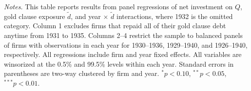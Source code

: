 \begin{table}[p]
    \vspace*{3mm} \justifying \noindent
\scriptsize{\textit{Notes.} This table reports results from panel regressions of net investment on $Q$, gold clause exposure $\tilde{d}$, and year $\times$ $\tilde{d}$ interactions, where 1932 is the omitted category. Column 1 excludes firms that repaid all of their gold clause debt anytime from 1931 to 1935. Columns 2--4 restrict the sample to balanced panels of firms with observations in each year for 1930--1936, 1929--1940, and 1926--1940, respectively. All regressions include firm and year fixed effects. All variables are winsorized at the 0.5\% and 99.5\% levels within each year. Standard errors in parentheses are two-way clustered by firm and year. $^{*}p<0.10$, $^{**}p<0.05$, $^{***}p<0.01$.}
\end{table}